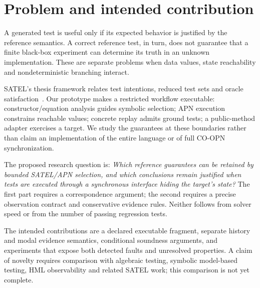 \section{Problem and intended contribution}
A generated test is useful only if its expected behavior is justified by the
reference semantics. A correct reference test, in turn, does not guarantee that a
finite black-box experiment can determine its truth in an unknown implementation.
These are separate problems when data values, state reachability and
nondeterministic branching interact.

SATEL's thesis framework relates test intentions, reduced test sets and oracle
satisfaction~\cite{lucio2009}. Our prototype makes a restricted workflow executable:
constructor/equation analysis guides symbolic selection; APN execution constrains
reachable values; concrete replay admits ground tests; a public-method adapter
exercises a target. We study the guarantees at these boundaries rather than claim
an implementation of the entire language or of full CO-OPN synchronization.

The proposed research question is: \emph{Which reference guarantees can be retained
by bounded SATEL/APN selection, and which conclusions remain justified when tests
are executed through a synchronous interface hiding the target's state?}
The first part requires a correspondence argument; the second requires a precise
observation contract and conservative evidence rules. Neither follows from solver
speed or from the number of passing regression tests.

The intended contributions are a declared executable fragment, separate history
and modal evidence semantics, conditional soundness arguments, and experiments
that expose both detected faults and unresolved properties. A claim of novelty
requires comparison with algebraic testing, symbolic model-based testing, HML
observability and related SATEL work; this comparison is not yet complete.

